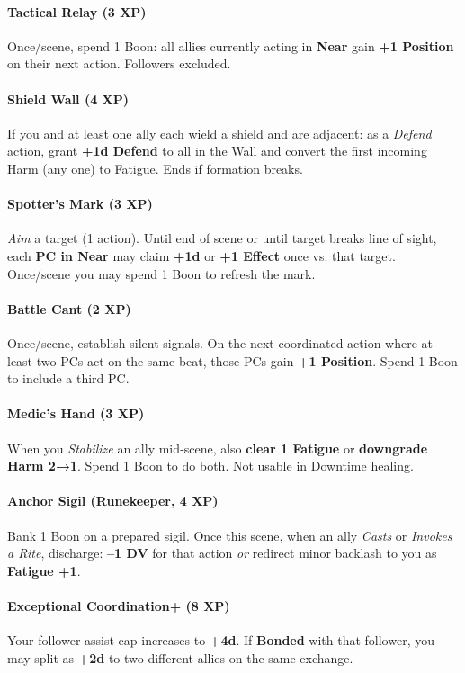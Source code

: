 \paragraph{Tactical Relay (3 XP)}
Once/scene, spend 1 Boon: all allies currently acting in \textbf{Near} gain \textbf{+1 Position} on their next action. Followers excluded.

\paragraph{Shield Wall (4 XP)}
If you and at least one ally each wield a shield and are adjacent: as a \emph{Defend} action, grant \textbf{+1d Defend} to all in the Wall and convert the first incoming Harm (any one) to Fatigue. Ends if formation breaks.

\paragraph{Spotter's Mark (3 XP)}
\emph{Aim} a target (1 action). Until end of scene or until target breaks line of sight, each \textbf{PC in Near} may claim \textbf{+1d} or \textbf{+1 Effect} once vs. that target. Once/scene you may spend 1 Boon to refresh the mark.

\paragraph{Battle Cant (2 XP)}
Once/scene, establish silent signals. On the next coordinated action where at least two PCs act on the same beat, those PCs gain \textbf{+1 Position}. Spend 1 Boon to include a third PC.

\paragraph{Medic's Hand (3 XP)}
When you \emph{Stabilize} an ally mid‑scene, also \textbf{clear 1 Fatigue} or \textbf{downgrade Harm 2→1}. Spend 1 Boon to do both. Not usable in Downtime healing.

\paragraph{Anchor Sigil (Runekeeper, 4 XP)}
Bank 1 Boon on a prepared sigil. Once this scene, when an ally \emph{Casts} or \emph{Invokes a Rite}, discharge: \textbf{--1 DV} for that action \emph{or} redirect minor backlash to you as \textbf{Fatigue +1}.

\paragraph{Exceptional Coordination+ (8 XP)}
Your follower assist cap increases to \textbf{+4d}. If \textbf{Bonded} with that follower, you may split as \textbf{+2d} to two different allies on the same exchange.

